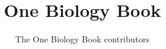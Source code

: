 \documentclass[11pt,a4paper,twoside,openany]{book}
\title{One Biology Book}
\author{The One Biology Book contributors}
\date{\bookdate}
\begin{document}
\frontmatter




\tableofcontents

\mainmatter



\appendix
\part{\omsolutionspart}


\backmatter
\printindex
\end{document}
